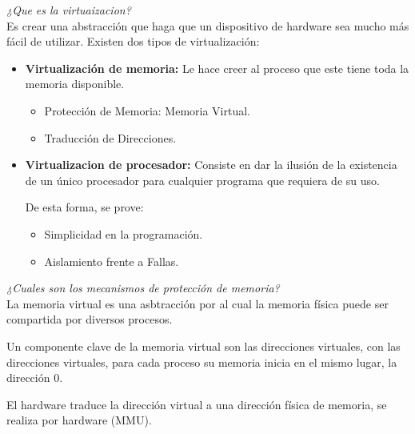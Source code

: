 \documentclass[../main.tex]{subfiles}
\begin{document}
    \begin{exercise}
        \textit{¿Que es la virtuaizacion?}\\

        Es crear una abstracción que haga que un dispositivo de hardware sea mucho más fácil de utilizar.
        Existen dos tipos de virtualización:
        \begin{itemize}
            \item \textbf{Virtualización de memoria:} Le hace creer al proceso que este tiene toda la memoria disponible.
                \begin{itemize}
                    \item Protección de Memoria: Memoria Virtual.
                    \item Traducción de Direcciones.
                \end{itemize} 
            \item \textbf{Virtualizacion de procesador:} Consiste en dar la ilusión de la existencia de un único procesador para cualquier programa que requiera de su uso.
            
            De esta forma, se prove:
            \begin{itemize}
                \item Simplicidad en la programación.
                \item Aislamiento frente a Fallas.
            \end{itemize}
        \end{itemize}
    \end{exercise}

    \begin{exercise}
        \textit{¿Cuales son los mecanismos de protección de memoria?}\\

        La memoria virtual es una asbtracción por al cual la memoria física puede ser compartida por diversos procesos.

        Un componente clave de la memoria virtual son las direcciones virtuales, con las direcciones virtuales, para cada proceso su memoria inicia en el mismo lugar, la dirección 0. 
        
        El hardware traduce la dirección virtual a una dirección física de memoria, se realiza por hardware (MMU).
    \end{exercise}
\end{document}
